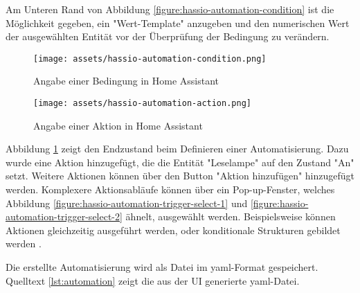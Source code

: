 Am Unteren Rand von Abbildung \ref{figure:hassio-automation-condition} ist die Möglichkeit gegeben,
ein "Wert-Template" anzugeben und den numerischen Wert der ausgewählten Entität vor der Überprüfung
der Bedingung zu verändern.

\begin{figure}[!ht]
  \texttt{[image: assets/hassio-automation-condition.png]}
  \caption{Angabe einer Bedingung in Home Assistant}
  \label{figure:hassio-automation-condition}
  \endminipage
  \hfill
  \texttt{[image: assets/hassio-automation-action.png]}
  \caption{Angabe einer Aktion in Home Assistant}
  \label{figure:hassio-automation-action}
  \endminipage
\end{figure}

Abbildung \ref{figure:hassio-automation-action} zeigt den Endzustand beim Definieren einer
Automatisierung. Dazu wurde eine Aktion hinzugefügt, die die Entität "Leselampe" auf den Zustand
"An" setzt. Weitere Aktionen können über den Button "Aktion hinzufügen" hinzugefügt werden.
Komplexere Aktionsabläufe können über ein Pop-up-Fenster, welches Abbildung
\ref{figure:hassio-automation-trigger-select-1} und \ref{figure:hassio-automation-trigger-select-2}
ähnelt, ausgewählt werden. Beispielsweise können Aktionen gleichzeitig ausgeführt werden, oder
konditionale Strukturen gebildet werden \parencite{homeassistantScriptSyntax}.



Die erstellte Automatisierung wird als Datei im \ac{yaml}-Format gespeichert. Quelltext
\ref{lst:automation} zeigt die aus der UI generierte \ac{yaml}-Datei. 
